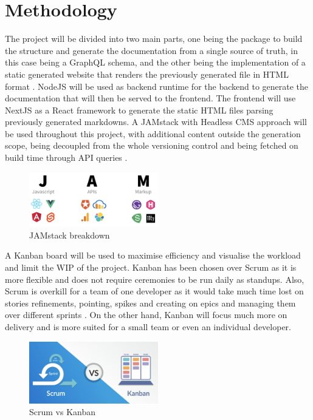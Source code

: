 \section*{Methodology}
\label{s:Methodology}
The project will be divided into two main parts, one being the package to build
the structure and generate the documentation from a single source of truth, in
this case being a GraphQL schema, and the other being the implementation of a
static generated website that renders the previously generated file in HTML
format \citep{gagliardiDjangoRESTMeets2021}. NodeJS will be used as backend
runtime for the backend to generate the documentation that will then be served
to the frontend. The frontend will use NextJS as a React framework to generate
the static HTML files parsing previously generated markdowns. A JAMstack with
Headless CMS approach will be used throughout this project, with additional
content outside the generation scope, being decoupled from the whole versioning
control and being fetched on build time through API queries
\citep{zammettiWhatJAMstackAll2020}.
\begin{figure}[H]
  \centering
  \includegraphics[width=0.5\textwidth]{figures/jackstack}
  \caption{JAMstack breakdown \citep{freecodecampWhatJAMstackHow2020}}
  \label{f:jackstack}
\end{figure}
A Kanban board will be used to maximise efficiency and visualise the workload
and limit the WIP of the project. Kanban has been chosen over Scrum as it is
more flexible and does not require ceremonies to be run daily as standups. Also,
Scrum is overkill for a team of one developer as it would take much time lost on
stories refinements, pointing, spikes and creating on epics and managing them
over different sprints \citep{zayatFrameworkStudyAgile2020}. On the other hand,
Kanban will focus much more on delivery and is more suited for a small team or
even an individual developer.
\begin{figure}[ht]
  \centering
  \includegraphics[width=0.5\textwidth]{figures/agile}
  \caption{Scrum vs Kanban \citep{theagilehelpScrumVsKanban2020}}
  \label{f:agile}
\end{figure}
